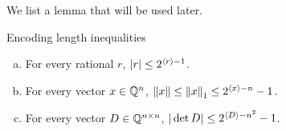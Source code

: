 We list a lemma that will be used later.
\begin{lemma}{Encoding length inequalities}
  \begin{enumerate}[(a)]
    \item For every rational \(r\), \(|r| \leq 2^{\langle {r} \rangle - 1}\).
    \item For every vector \(x \in \mathbb Q^n\), \(\left\lVert x\right\rVert \leq \left\lVert x\right\rVert_1 \leq 2^{\langle {x} \rangle - n} - 1\).
    \item For every vector \(D \in \mathbb Q^{n\times n}\), \(|\det D| \leq 2^{\langle {D} \rangle - n^2} - 1\).
  \end{enumerate}
\end{lemma}
